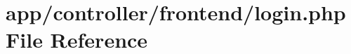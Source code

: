 \hypertarget{login_8php}{\section{app/controller/frontend/login.php File Reference}
\label{login_8php}
}
